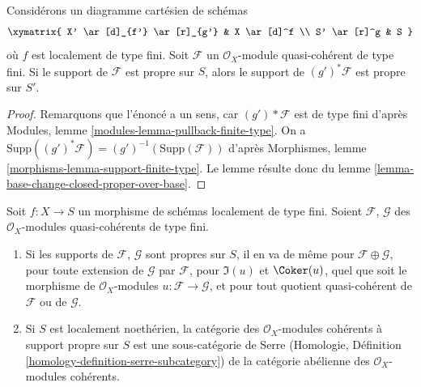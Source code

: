 \begin{lemma}
\label{lemma-base-change-module-support-proper-over-base}
Considérons un diagramme cartésien de schémas
$$
\xymatrix{
X' \ar[d]_{f'} \ar[r]_{g'} & X \ar[d]^f \\
S' \ar[r]^g & S
}
$$
où $f$ est localement de type fini. Soit $\mathcal{F}$
un $\mathcal{O}_X$-module quasi-cohérent
de type fini. Si le support de $\mathcal{F}$ est propre sur $S$, alors
le support de $(g')^*\mathcal{F}$ est propre sur $S'$.
\end{lemma}

\begin{proof}
Remarquons que l'énoncé a un sens, car
$(g')*\mathcal{F}$ est de type fini d'après
Modules, lemme \ref{modules-lemma-pullback-finite-type}.
On a $\text{Supp}((g')^*\mathcal{F}) = (g')^{-1}(\text{Supp}(\mathcal{F}))$
d'après Morphismes, lemme \ref{morphisms-lemma-support-finite-type}.
Le lemme résulte donc du
lemme \ref{lemma-base-change-closed-proper-over-base}.
\end{proof}

\begin{lemma}
\label{lemma-cat-module-support-proper-over-base}
Soit $f : X \to S$ un morphisme de schémas localement de
type fini. Soient $\mathcal{F}$, $\mathcal{G}$
des $\mathcal{O}_X$-modules quasi-cohérents de type fini.
\begin{enumerate}
\item Si les supports de $\mathcal{F}$, $\mathcal{G}$
sont propres sur $S$, il en va de même
pour $\mathcal{F} \oplus \mathcal{G}$, pour toute extension
de $\mathcal{G}$ par $\mathcal{F}$, pour $\Im(u)$ et $\Coker(u)$,
quel que soit le morphisme de $\mathcal{O}_X$-modules $u : \mathcal{F} \to \mathcal{G}$,
et pour tout quotient quasi-cohérent de $\mathcal{F}$ ou de $\mathcal{G}$.
\item Si $S$ est localement noethérien, la catégorie
des $\mathcal{O}_X$-modules cohérents à support propre sur
$S$ est une sous-catégorie de Serre (Homologie, Définition
\ref{homology-definition-serre-subcategory})
de la catégorie abélienne
des $\mathcal{O}_X$-modules cohérents.
\end{enumerate}
\end{lemma}

